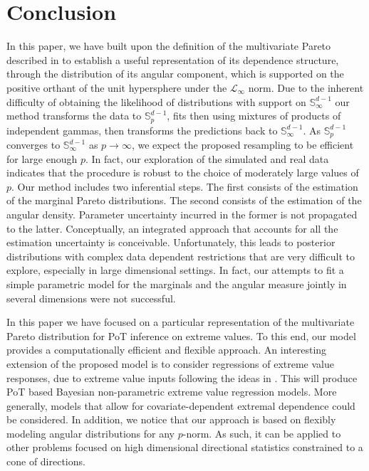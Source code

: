 \section{Conclusion\label{sec:conclusion}}
In this paper, we have built upon the definition of the multivariate Pareto 
    described in \cite{ferreira2014} to establish a useful representation of 
    its dependence structure, through the distribution of its angular component,
    which is supported on the positive orthant of the unit hypersphere under 
    the $\mathcal{L}_{\infty}$ norm.  Due to the inherent difficulty of 
    obtaining the likelihood of distributions with support on ${\mathbb S}^{d-1}_\infty$ 
    our method transforms the data to ${\mathbb S}_{p}^{d-1}$, fits then using mixtures of 
    products of independent gammas, then transforms the predictions back to 
    ${\mathbb S}^{d-1}_\infty$. As ${\mathbb S}_{p}^{d-1}$ converges to 
    ${\mathbb S}_{\infty}^{d-1}$ as  $p\to\infty$, we expect the proposed 
    resampling to be efficient for large enough $p$. In fact, our exploration 
    of the simulated and real data indicates that the procedure is robust to 
    the choice of moderately large values of $p$. 
    Our method includes two inferential steps. The first consists of the
    estimation of the marginal Pareto distributions. The second consists 
    of the estimation of the angular density. Parameter uncertainty incurred in
    the former is not propagated to the latter. Conceptually, an integrated approach 
    that accounts for all the estimation uncertainty is conceivable. Unfortunately, 
    this leads to posterior distributions with complex data dependent restrictions 
    that  are very difficult to explore, especially in large dimensional settings. In 
    fact, our attempts to fit a simple parametric model for the marginals and the
    angular measure jointly in several dimensions were not successful.

In this paper we have focused on a particular representation of the multivariate
    Pareto distribution for PoT inference on extreme values. To this end, our model 
    provides a computationally efficient and flexible approach. An interesting extension 
    of the proposed model is to consider regressions of extreme value responses, due
    to extreme value inputs following the ideas in  \cite{carvalho2022}. This will 
    produce PoT based Bayesian non-parametric extreme value regression models. More 
    generally,  models that allow for covariate-dependent extremal dependence 
    \citep{mhalla2019} could be considered. In addition, we notice that our approach 
    is based on flexibly  modeling angular distributions for any $p$-norm. As such, 
    it can be applied to other problems focused on high dimensional directional 
    statistics  constrained  to a cone of directions. 
 
